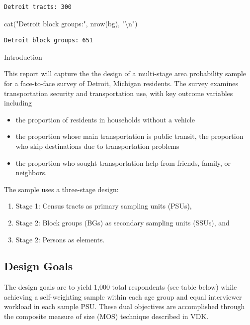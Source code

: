 \documentclass[
  12pt]{article}
\newenvironment{Shaded}{\begin{snugshade}}{\end{snugshade}}
\newcommand{\FunctionTok}[1]{\textcolor[rgb]{0.28,0.35,0.67}{#1}}
\newcommand{\NormalTok}[1]{\textcolor[rgb]{0.00,0.23,0.31}{#1}}
\newcommand{\SpecialCharTok}[1]{\textcolor[rgb]{0.37,0.37,0.37}{#1}}
\newcommand{\StringTok}[1]{\textcolor[rgb]{0.13,0.47,0.30}{#1}}
\providecommand{\tightlist}{%
  \setlength{\itemsep}{0pt}\setlength{\parskip}{0pt}}
\begin{document}
\begin{verbatim}
Detroit tracts: 300 
\end{verbatim}

\begin{Shaded}
\begin{Highlighting}[]
\FunctionTok{cat}\NormalTok{(}\StringTok{"Detroit block groups:"}\NormalTok{, }\FunctionTok{nrow}\NormalTok{(bg), }\StringTok{"}\SpecialCharTok{\textbackslash{}n}\StringTok{"}\NormalTok{)}
\end{Highlighting}
\end{Shaded}

\begin{verbatim}
Detroit block groups: 651 
\end{verbatim}

\newpage

Introduction

This report will capture the the design of a multi-stage area
probability sample for a face-to-face survey of Detroit, Michigan
residents. The survey examines transportation security and
transportation use, with key outcome variables including

\begin{itemize}
\item
  the proportion of residents in households without a vehicle
\item
  the proportion whose main transportation is public transit, the
  proportion who skip destinations due to transportation problems
\item
  the proportion who sought transportation help from friends, family, or
  neighbors.
\end{itemize}

The sample uses a three-stage design:

\begin{enumerate}
\def\labelenumi{\arabic{enumi}.}
\tightlist
\item
  Stage 1: Census tracts as primary sampling units (PSUs),
\item
  Stage 2: Block groups (BGs) as secondary sampling units (SSUs), and
\item
  Stage 2: Persons as elements.
\end{enumerate}

\subsection{Design Goals}\label{design-goals}

The design goals are to yield 1,000 total respondents (see table below)
while achieving a self-weighting sample within each age group and equal
interviewer workload in each sample PSU. These dual objectives are
accomplished through the composite measure of size (MOS) technique
described in VDK.
\end{document}
